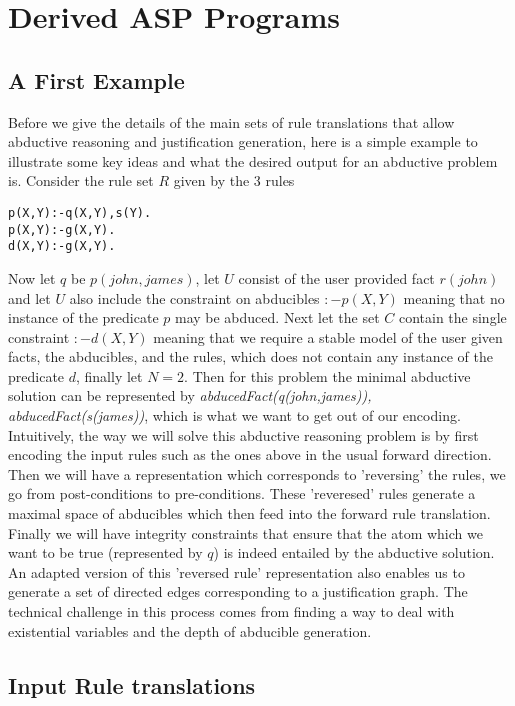\section{Derived ASP Programs}\label{sec:derived_asp}
\subsection{A First Example}
Before we give the details of the main sets of rule translations that allow
abductive reasoning and justification generation, here is a simple example to
illustrate some key ideas and what the desired output for an abductive problem
is. Consider the rule set $R$ given by the 3 rules
\begin{lstlisting}[frame=none]
p(X,Y):-q(X,Y),s(Y).
p(X,Y):-g(X,Y).
d(X,Y):-g(X,Y).
\end{lstlisting}
Now let $q$ be $p(john,james)$, let $U$ consist of the user provided fact
$r(john)$ and let $U$ also include the constraint on abducibles $:-p(X,Y)$
meaning that no instance of the predicate $p$ may be abduced. Next let the set
$C$ contain the single constraint $:-d(X,Y)$ meaning that we require a stable
model of the user given facts, the abducibles, and the rules, which does not
contain any instance of the predicate $d$, finally let $N = 2$. Then for this
problem the minimal abductive solution can be represented by
\textit{abducedFact(q(john,james)), abducedFact(s(james))}, which is what we
want to get out of our encoding. Intuitively, the way we will solve this
abductive reasoning problem is by first encoding the input rules such as the
ones above in the usual forward direction. Then we will have a representation which
corresponds to 'reversing' the rules, \ie we go from post-conditions to
pre-conditions. These 'reveresed' rules
generate a maximal space of abducibles which then feed into the forward rule
translation. Finally we will have integrity constraints that ensure that the
atom which we want to be true (represented by $q$) is indeed entailed by the
abductive solution. An adapted version of this 'reversed rule' representation
also enables us to generate a set of directed edges corresponding to a
justification graph. The technical challenge in this process comes from
finding a way to deal with existential variables and the depth of abducible generation.

\subsection{Input Rule translations}

